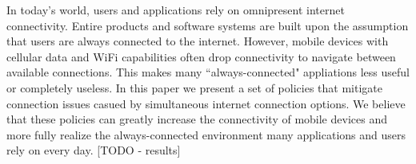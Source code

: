 
In today's world, users and applications rely on omnipresent internet connectivity. Entire products and software systems are built upon the assumption that users are always connected to the internet. However, mobile devices with cellular data and WiFi capabilities often drop connectivity to navigate between available connections. This makes many ``always-connected" appliations less useful or completely useless. In this paper we present a set of policies that mitigate connection issues casued by simultaneous internet connection options. We believe that these policies can greatly increase the connectivity of mobile devices and more fully realize the always-connected environment many applications and users rely on every day. [TODO - results]